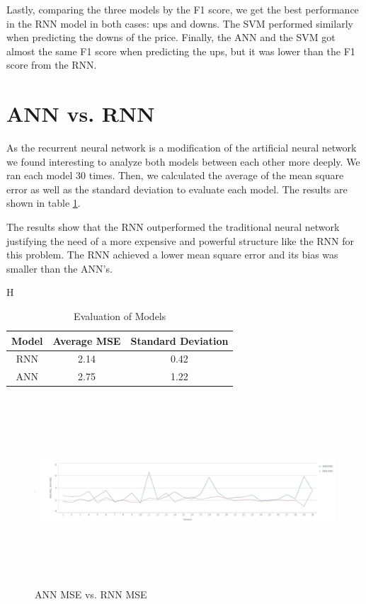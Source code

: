 Lastly, comparing the three models by the F1 score, we get the best performance in the RNN model in both cases: ups and downs. The SVM performed similarly when predicting the downs of the price. Finally, the ANN and the SVM got almost the same F1 score when predicting the ups, but it was lower than the F1 score from the RNN. 

\section{ANN vs. RNN}
As the recurrent neural network is a modification of the artificial neural network we found interesting to analyze both models between each other more deeply. We ran each model 30 times. Then, we calculated the average of the mean square error as well as the standard deviation to evaluate each model. The results are shown in table 
\ref{table:nnRnn}.

The results show that the RNN outperformed the traditional neural network justifying the need of a more expensive and powerful structure like the RNN for this problem. The RNN achieved a lower mean square error and its bias was smaller than the ANN's.

\begin{table}{H}
\begin{center}
\begin{tabular}{ c | c | c }
    \hline
     \textbf{Model} &  \textbf{Average MSE} &    \textbf{Standard Deviation}\\ \hline
    RNN&  2.14&  0.42 \\ \hline
    ANN&  2.75&  1.22\\ \hline
      \hline
  \end{tabular}
\caption{Evaluation of Models}
 \label{table:nnRnn}
\end{center}
 \end{table}
\begin{figure}
\label{fig:errors}
\center
\includegraphics[width=13cm,height=7cm]{Figures/errors.JPG}
\caption{ANN MSE vs. RNN MSE}
\end{figure}

 
 

 
 
